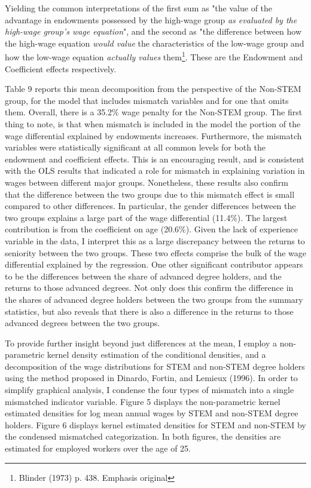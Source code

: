 \documentclass[11pt]{article}
\theoremstyle{definition}
\begin{document}
Yielding the common interpretations of the first sum as "the value of the advantage in endowments possessed by the high-wage group \textit{as evaluated by the high-wage group's wage equation}", and the second as "the difference between how the high-wage equation \textit{would value} the characteristics of the low-wage group and how the low-wage equation \textit{actually values} them\footnote{Blinder (1973) p. 438.  Emphasis original}.  These are the Endowment and Coefficient effects respectively.  

Table 9 reports this mean decomposition from the perspective of the Non-STEM group, for the model that includes mismatch variables and for one that omits them.  Overall, there is a 35.2\% wage penalty for the Non-STEM group.  The first thing to note, is that when mismatch is included in the model the portion of the wage differential explained by endowments increases.  Furthermore, the mismatch variables were statistically significant at all common levels for both the endowment and coefficient effects.  This is an encouraging result, and is consistent with the OLS results that indicated a role for mismatch in explaining variation in wages between different major groups.  Nonetheless, these results also confirm that the difference between the two groups due to this mismatch effect is small compared to other differences.  In particular, the gender differences between the two groups explains a large part of the wage differential (11.4\%).  The largest contribution is from the coefficient on age (20.6\%).  Given the lack of experience variable in the data, I interpret this as a large discrepancy between the returns to seniority between the two groups.  These two effects comprise the bulk of the wage differential explained by the regression.  One other significant contributor appears to be the differences between the share of advanced degree holders, and the returns to those advanced degrees.  Not only does this confirm the difference in the shares of advanced degree holders between the two groups from the summary statistics, but also reveals that there is also a difference in the returns to those advanced degrees between the two groups.  

To provide further insight beyond just differences at the mean, I employ a non-parametric kernel density estimation of the conditional densities, and a decomposition of the wage distributions for STEM and non-STEM degree holders using the method proposed in Dinardo, Fortin, and Lemieux (1996).   In order to simplify graphical analysis, I condense the four types of mismatch into a single mismatched indicator variable.  Figure 5 displays the non-parametric kernel estimated densities for log mean annual wages by STEM and non-STEM degree holders.   Figure 6 displays kernel estimated densities for STEM and non-STEM by the condensed mismatched categorization.  In both figures, the densities are estimated for employed workers over the age of 25.    
\end{document}
